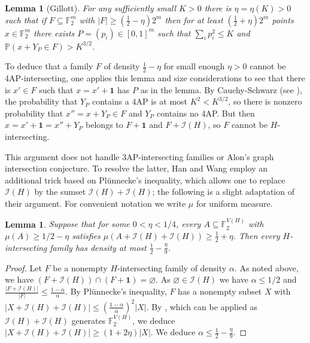 \documentclass[11pt]{article}
\newtheorem{lemma}[theorem]{Lemma}
\newcommand{\I}{\mathcal I}
\newcommand{\Prob}{\mathbb P}
\newcommand{\1}{\mathbf 1}
\begin{document}
\begin{lemma}[Gillott]\label{lem:gillott-param}
For any sufficiently small $K>0$ there is  \(\eta=\eta(K)>0\)
such that if \(F\subseteq\mathbb{F}_2^m\) with $|F| \ge (\tfrac12-\eta)2^m$
then for at least $ (\tfrac12+\eta)2^m$ points  \(x\in\mathbb{F}_2^m\) 
there exists \(P=(p_i)\in[0,1]^m\) such that $\sum_i p_i^2\le K$
and $ \Prob(x+Y_P\in F)>K^{3/2}$.
\end{lemma}

To deduce that a family $F$ of density $\tfrac12-\eta$ for small enough $\eta>0$
cannot be 4AP-intersecting, one applies this lemma and size considerations to see
that there is $x' \in F$ such that $x=x'+\1$ has $P$ as in the lemma.
By Cauchy-Schwarz (see \cite[Theorem~3.3]{Gillott2026}),
the probability that $Y_P$ contains a 4AP is at most $K^2 < K^{3/2}$,
so there is nonzero probability that $x''=x+Y_P \in F$ and $Y_P$ contains no 4AP.
But then $x=x'+\1=x''+Y_P$ belongs to $F+\1$ and $F+\I(H)$, so $F$ cannot be $H$-intersecting.

This argument does not handle 3AP-intersecting families or Alon's graph intersection conjecture.
To resolve the latter, Han and Wang \cite{HanWang2026} employ an additional trick 
based on  Pl\"unnecke's inequality, which allows one to replace $\I(H)$ by the sumset $\I(H)+\I(H)$;
the following is a slight adaptation of their argument. For convenient notation we write $\mu$ for uniform measure.

\begin{lemma}\label{lem:additive-reduction}
Suppose that for some \(0<\eta<1/4\), every
\( A\subseteq\mathbb{F}_2^{V(H)}\) with \( \mu(A)\ge1/2-\eta\) 
satisfies \( \mu( A+\I(H)+\I(H))\ge\frac12+\eta\).
Then every \(H\)-intersecting family has density
at most $\tfrac12-\tfrac{\eta}{9}$.
\end{lemma}

\begin{proof}
Let \(F\) be a nonempty \(H\)-intersecting family of density \(\alpha\). 
As noted above, we have \((F+\I(H))\cap(F+\1)=\varnothing\).
As \(\varnothing\in\I(H)\) we have $\alpha \le 1/2$
and $\frac{|F+\I(H)|}{|F|} \le\frac{1-\alpha}{\alpha}$.
By Pl\"unnecke's inequality, $F$ has a nonempty subset $X$
with \(  |X+\I(H)+\I(H)| \le
  \left(\frac{1-\alpha}{\alpha}\right)^2|X| \).
By \cite[Lemma 2.2]{HanWang2026}, which can be applied
as $\I(H)+\I(H)$ generates $\mathbb{F}_2^{V(H)}$,
we deduce \(|X+\I(H)+\I(H)|\ge(1+2\eta)|X|\).
We deduce $\alpha \le \tfrac12-\tfrac{\eta}{9}$.
\end{proof}
\end{document}
